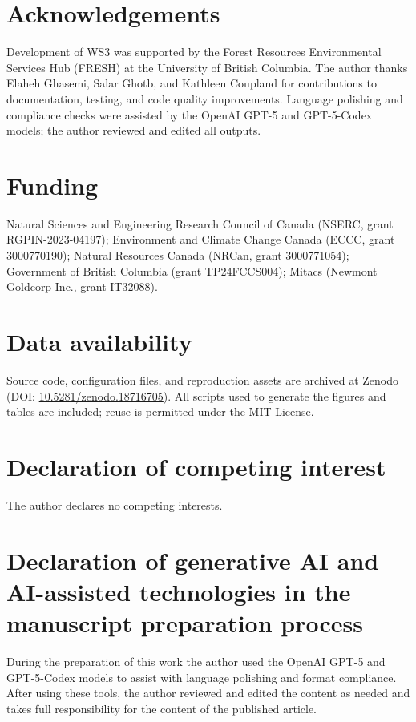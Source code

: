 \documentclass[review]{elsarticle}
\begin{document}
\section*{Acknowledgements}
Development of WS3 was supported by the Forest Resources Environmental Services Hub (FRESH) at the University of British Columbia. The author thanks Elaheh Ghasemi, Salar Ghotb, and Kathleen Coupland for contributions to documentation, testing, and code quality improvements. Language polishing and compliance checks were assisted by the OpenAI GPT-5 and GPT-5-Codex models; the author reviewed and edited all outputs.

\section*{Funding}
Natural Sciences and Engineering Research Council of Canada (NSERC, grant RGPIN-2023-04197); Environment and Climate Change Canada (ECCC, grant 3000770190); Natural Resources Canada (NRCan, grant 3000771054); Government of British Columbia (grant TP24FCCS004); Mitacs (Newmont Goldcorp Inc., grant IT32088).

\section*{Data availability}
Source code, configuration files, and reproduction assets are archived at Zenodo (DOI: \url{10.5281/zenodo.18716705}). All scripts used to generate the figures and tables are included; reuse is permitted under the MIT License.

\section*{Declaration of competing interest}
The author declares no competing interests.

\section*{Declaration of generative AI and AI-assisted technologies in the manuscript preparation process}
During the preparation of this work the author used the OpenAI GPT-5 and GPT-5-Codex models to assist with language polishing and format compliance. After using these tools, the author reviewed and edited the content as needed and takes full responsibility for the content of the published article.



\end{document}
